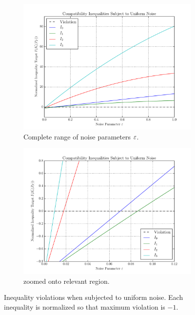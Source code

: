\documentclass[aps, 10pt, english, twoside, pra, nofootinbib, tightenlines, longbibliography]{revtex4-1}
\begin{document}
    \begin{center}
    \begin{figure}
    \begin{subfigure}[b]{.48\linewidth}
    \includegraphics[width=\linewidth]{../../figures/noise/noise_2017.pdf}
    \caption{Complete range of noise parameters $\varepsilon$.}\label{fig:noise}
    \end{subfigure}
    \begin{subfigure}[b]{.48\linewidth}
    \includegraphics[width=\linewidth]{../../figures/noise/noise_2017_lims.pdf}
    \caption{ zoomed onto relevant region.}\label{fig:noise_zoomed}
    \end{subfigure}
    \caption{Inequality violations when subjected to uniform noise. Each inequality is normalized so that maximum violation is $-1$.}\label{fig:master_noise}
    \end{figure}
    \end{center}
\end{document}
